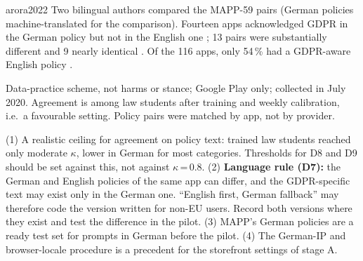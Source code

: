 \begin{papercard}{arora2022}
 Two bilingual authors compared the MAPP-59 pairs (German policies machine-translated for the comparison). Fourteen apps acknowledged GDPR in the German policy but not in the English one ; 13 pairs were substantially different and 9 nearly identical . Of the 116 apps, only 54\,\% had a GDPR-aware English policy .

 Data-practice scheme, not harms or stance; Google Play only; collected in July 2020. Agreement is among law students after training and weekly calibration, i.e.\ a favourable setting. Policy pairs were matched by app, not by provider.

 (1) A realistic ceiling for agreement on policy text: trained law students reached only moderate $\kappa$, lower in German for most categories. Thresholds for D8 and D9 should be set against this, not against $\kappa$\,=\,0.8. (2) \textbf{Language rule (D7):} the German and English policies of the same app can differ, and the GDPR-specific text may exist only in the German one. ``English first, German fallback'' may therefore code the version written for non-EU users. Record both versions where they exist and test the difference in the pilot. (3) MAPP's German policies are a ready test set for prompts in German before the pilot. (4) The German-IP and browser-locale procedure is a precedent for the storefront settings of stage A.
\end{papercard}
